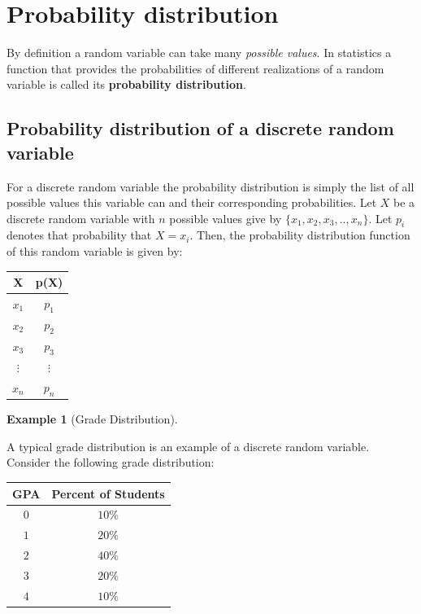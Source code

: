 \documentclass[
]{book}
\theoremstyle{definition}
\theoremstyle{definition}
\newtheorem{example}{Example}[chapter]
\theoremstyle{definition}
\theoremstyle{definition}
\theoremstyle{remark}
\begin{document}
\hypertarget{probability-distribution}{%
\section{Probability distribution}\label{probability-distribution}}

By definition a random variable can take many \emph{possible values}. In statistics a function that provides the probabilities of different realizations of a random variable is called its \textbf{probability distribution}.

\hypertarget{probability-distribution-of-a-discrete-random-variable}{%
\subsection{Probability distribution of a discrete random variable}\label{probability-distribution-of-a-discrete-random-variable}}

For a discrete random variable the probability distribution is simply the list of all possible values this variable can and their corresponding probabilities. Let \(X\) be a discrete random variable with \(n\) possible values give by \(\{x_1,x_2,x_3,..,x_n\}\). Let \(p_i\) denotes that probability that \(X=x_i\). Then, the probability distribution function of this random variable is given by:

\begin{longtable}[]{@{}cc@{}}
\toprule()
X & p(X) \\
\midrule()
\endhead
\(x_1\) & \(p_1\) \\
\(x_2\) & \(p_2\) \\
\(x_3\) & \(p_3\) \\
\(\vdots\) & \(\vdots\) \\
\(x_n\) & \(p_n\) \\
\bottomrule()
\end{longtable}

\begin{example}[Grade Distribution]
\protect\hypertarget{exm:unnamed-chunk-27}{}\label{exm:unnamed-chunk-27}

A typical grade distribution is an example of a discrete random variable. Consider the following grade distribution:

\begin{longtable}[]{@{}cc@{}}
\toprule()
GPA & Percent of Students \\
\midrule()
\endhead
\(0\) & \(10\%\) \\
\(1\) & \(20\%\) \\
\(2\) & \(40\%\) \\
\(3\) & \(20\%\) \\
\(4\) & \(10\%\) \\
\bottomrule()
\end{longtable}

\end{example}
\end{document}
